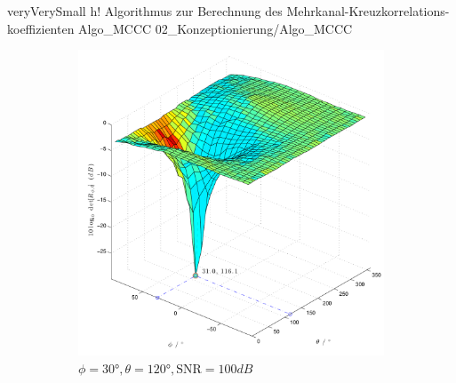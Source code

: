          {veryVerySmall}                                                       %
         {h!}                                                  %
         {Algorithmus zur Berechnung des Mehrkanal-Kreuzkorrelations-koeffizienten}    %
         {Algo_MCCC}                                               %
         {02_Konzeptionierung/Algo_MCCC}                           %

       
\begin{figure}
        \centering
        \begin{subfigure}[b]{0.48\textwidth}
                \centering
                \includegraphics[width=\textwidth]{images/02_Konzeptionierung/Sim_voice_Phi_30_Theta_120_SNR_100dB_log}
                \caption{$\phi=30°,\theta=120°, \mathrm{SNR}=100dB$}
                \label{fig:Sim_Phi_30_Theta_120_dB}
        \end{subfigure}
        ~ %
        \begin{subfigure}[b]{0.48\textwidth}

\end{subfigure}
\end{figure}
